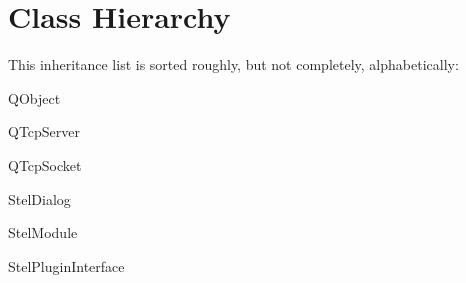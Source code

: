 \section{Class Hierarchy}
This inheritance list is sorted roughly, but not completely, alphabetically\+:\begin{DoxyCompactList}
\item Q\+Object\begin{DoxyCompactList}
\item {}
\end{DoxyCompactList}
\item Q\+Tcp\+Server\begin{DoxyCompactList}
\item {}
\end{DoxyCompactList}
\item Q\+Tcp\+Socket\begin{DoxyCompactList}
\item {}
\end{DoxyCompactList}
\item Stel\+Dialog\begin{DoxyCompactList}
\item {}
\item {}
\end{DoxyCompactList}
\item Stel\+Module\begin{DoxyCompactList}
\item {}
\end{DoxyCompactList}
\item Stel\+Plugin\+Interface\begin{DoxyCompactList}
\item {}
\end{DoxyCompactList}
\end{DoxyCompactList}
